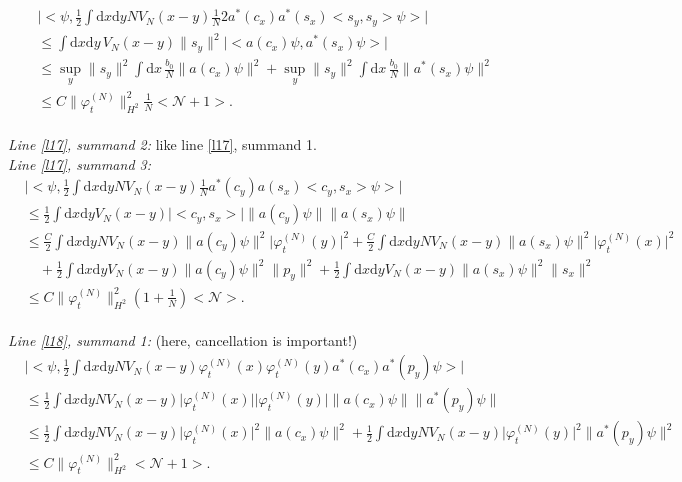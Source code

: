 \documentclass[11pt,a4paper,DIV11]{scrartcl}	%
\newcommand{\di}{\textrm{d}}		%
\newcommand{\Ncal}{\mathcal{N}}		%
\newcommand{\estlist}[2]{\emph{\vspace{.3em}\\Line \ref{l#1}, summand #2:}}
\newcommand{\nestlist}[2]{line \ref{l#1}, summand #2}
\newcommand{\Nestlist}[2]{Line \ref{l#1}, summand #2}
\newcommand{\scal}[2]{\big<#1,#2\big>} %
\newcommand{\norm}[1]{\lVert#1\rVert}	%
\newcommand{\ev}[1]{\big<#1\big>}	%
\newcommand{\ph}{\varphi_t^{(N)}}	%
\newcommand{\dxyNV}{\frac{1}{2}\int \di x\di y N V_N(x-y)} %
\newcommand{\dxyV}{\frac{1}{2}\int \di x\di y V_N(x-y)} %
\begin{document}
\begin{fleqn}[0.5em]
\begin{align*}
 & \lvert \scal{\psi}{\dxyNV \frac{1}{N}2 a^\ast(c_x)a^\ast(s_x) \scal{s_y}{s_y}\psi} \rvert \\
& \leq \int \di x\di y\, V_N(x-y) \norm{s_y}^2 \lvert \scal{a(c_x)\psi}{a^\ast(s_x)\psi}\rvert \\
& \leq \sup_y \norm{s_y}^2 \int \di x\, \frac{b_0}{N} \norm{a(c_x)\psi}^2 + \sup_y \norm{s_y}^2 \int \di x\, \frac{b_0}{N} \norm{a^\ast(s_x)\psi}^2 \\
& \leq C \norm{\ph}_{H^2}^2 \frac{1}{N}\ev{\Ncal+1}.
\end{align*}
\emph{\vspace{.3em}\\\Nestlist{17}{2}:} like \nestlist{17}{1}.\newline
\estlist{17}{3}
\begin{align*}
& \lvert \scal{\psi}{\dxyNV \frac{1}{N} a^\ast(c_y) a(s_x) \scal{c_y}{s_x} \psi} \rvert \\
& \leq \dxyV \lvert \scal{c_y}{s_x} \rvert \norm{a(c_y)\psi} \norm{a(s_x)\psi} \\
& \leq \frac{C}{2}\int \di x\di y N V_N(x-y) \norm{a(c_y)\psi}^2 \lvert\ph(y)\rvert^2 + \frac{C}{2}\int \di x\di y N V_N(x-y) \norm{a(s_x)\psi}^2 \lvert \ph(x)\rvert^2 \\
& \quad + \dxyV \norm{a(c_y)\psi}^2 \norm{p_y}^2 + \dxyV \norm{a(s_x)\psi}^2 \norm{s_x}^2 \\
& \leq C \norm{\ph}_{H^2}^2 \left(1+\frac{1}{N}\right)\ev{\Ncal}.
\end{align*}
\estlist{18}{1} (here, cancellation is important!)
\begin{align*}
& \lvert \scal{\psi}{\dxyNV \ph(x)\ph(y) a^\ast(c_x) a^\ast(p_y)\psi} \rvert \\
& \leq \dxyNV \lvert\ph(x)\rvert \lvert\ph(y)\rvert \norm{a(c_x)\psi} \norm{a^\ast(p_y)\psi}\\
& \leq \dxyNV \lvert \ph(x)\rvert^2 \norm{a(c_x)\psi}^2 + \dxyNV \lvert\ph(y)\rvert^2 \norm{a^\ast(p_y)\psi}^2 \\
& \leq C\norm{\ph}_{H^2}^2 \ev{\Ncal+1}. 
\end{align*}

\end{fleqn}
\end{document}
